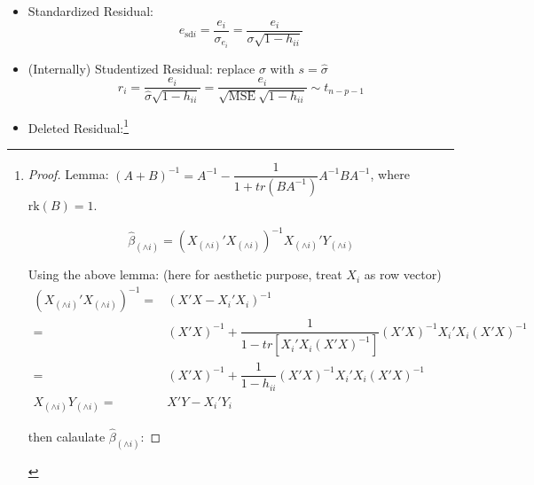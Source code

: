 \begin{itemize}[topsep=2pt,itemsep=2pt]
    \item Standardized Residual:
    \begin{equation}
         e_{\mathrm{sd}i}=\dfrac{e_i}{\sigma _{e_i}}=\dfrac{e_i}{\sigma \sqrt{1-h_{ii}}}
    \end{equation}
    \item (Internally) Studentized Residual: replace $ \sigma  $ with $ s=\hat{\sigma } $
    \begin{equation}\label{EqaInternalStudentizedResidual}
         r_i=\dfrac{e_i}{\hat{\sigma }\sqrt{1-h_{ii}}}=\dfrac{e_i}{\sqrt{\mathrm{MSE} }\sqrt{1-h_{ii}}}\sim t_{n-p-1}
    \end{equation}
    
    \item Deleted Residual:\footnote{
        \begin{proof}
            
        
    
        Lemma: $ (A+B)^{-1}=A^{-1}-\dfrac{1}{1+tr(BA^{-1})}A^{-1}BA^{-1} $, where $ \mathrm{rk}(B)=1  $.

        

        \begin{equation}
            \hat{\beta }_{(\wedge i)}=(X_{(\wedge i)}'X_{(\wedge i)})^{-1}X_{(\wedge i)}'Y_{(\wedge i)} 
        \end{equation}
        
        Using the above lemma: (here for aesthetic purpose, treat $ X_i $ as row vector)
        \begin{align*}
            (X_{(\wedge i)}'X_{(\wedge i)})^{-1}=&(X'X-X_i'X_i)^{-1}\\
            =&(X'X)^{-1}+\dfrac{1}{1-tr[X_i'X_i(X'X)^{-1}]}(X'X)^{-1}X_i'X_i(X'X)^{-1}\\
            =&(X'X)^{-1}+\dfrac{1}{1-h_{ii}}(X'X)^{-1}X_i'X_i(X'X)^{-1}\\
            X_{(\wedge i)}Y_{(\wedge i)}=&X'Y-X_i'Y_i
        \end{align*}

        then calaulate $ \hat{\beta }_{(\wedge i)} $:
   


\end{proof}}
\end{itemize}
